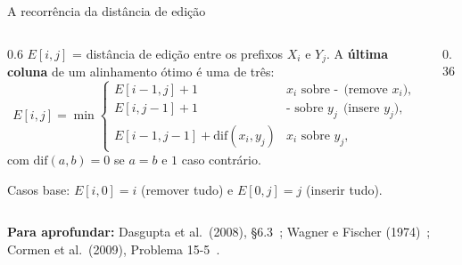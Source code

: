 \documentclass[aspectratio=169,xcolor=table]{beamer}
\newcommand{\fonte}[1]{%
  \vfill
  {\tiny\color{gray!55!black}\textbf{Para aprofundar:} #1\par}%
}
\begin{document}
\begin{frame}{A recorrência da distância de edição}
  \begin{columns}[c]
    \begin{column}{0.6\textwidth}
      \scriptsize $E[i,j]$ = distância de edição entre os prefixos $X_i$ e $Y_j$.
      A \textbf{última coluna} de um alinhamento ótimo é uma de três:
      \[
        E[i,j] = \min
        \begin{cases}
          E[i-1,j] + 1 & x_i \text{ sobre } \texttt{-}\ \ \text{(remove $x_i$)},\\[2pt]
          E[i,j-1] + 1 & \texttt{-} \text{ sobre } y_j\ \ \text{(insere $y_j$)},\\[2pt]
          E[i-1,j-1] + \mathrm{dif}(x_i,y_j) & x_i \text{ sobre } y_j,
        \end{cases}
      \]
      com $\mathrm{dif}(a,b) = 0$ se $a = b$ e $1$ caso contrário.
      \smallskip

      Casos base: $E[i,0] = i$ (remover tudo) e $E[0,j] = j$ (inserir tudo).
    \end{column}
    \begin{column}{0.36\textwidth}
      \centering
    \end{column}
  \end{columns}
  \fonte{Dasgupta et al.\ (2008), \S 6.3~\cite{dasgupta2008algorithms};
    Wagner e Fischer (1974)~\cite{wagner1974string};
    Cormen et al.\ (2009), Problema 15-5~\cite{cormen2009introduction}.}
\end{frame}
\end{document}
